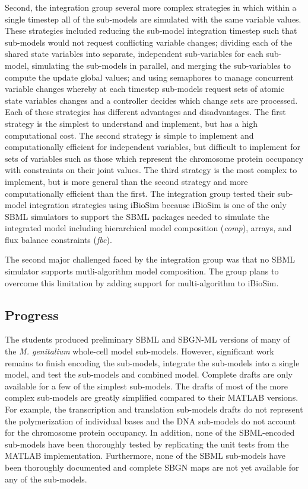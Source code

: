 \documentclass[journal,transmag]{IEEEtran}
\begin{document}
Second, the integration group several more complex strategies in which within a single timestep all of the sub-models are simulated with the same variable values. These strategies included reducing the sub-model integration timestep such that sub-models would not request conflicting variable changes; dividing each of the shared state variables into separate, independent sub-variables for each sub-model, simulating the sub-models in parallel, and merging the sub-variables to compute the update global values; and using semaphores to manage concurrent variable changes whereby at each timestep sub-models request sets of atomic state variables changes and a controller decides which change sets are processed. Each of these strategies has different advantages and disadvantages. The first strategy is the simplest to understand and implement, but has a high computational cost. The second strategy is simple to implement and computationally efficient for independent variables, but difficult to implement for sets of variables such as those which represent the chromosome protein occupancy with constraints on their joint values. The third strategy is the most complex to implement, but is more general than the second strategy and more computationally efficient than the first. The integration group tested their sub-model integration strategies using iBioSim because iBioSim is one of the only SBML simulators to support the SBML packages needed to simulate the integrated model including hierarchical model composition (\emph{comp}), arrays, and flux balance constraints (\emph{fbc}).

The second major challenged faced by the integration group was that no SBML simulator supports mutli-algorithm model composition. The group plans to overcome this limitation by adding support for multi-algorithm to iBioSim.

\subsection{Progress}
The students produced preliminary SBML and SBGN-ML versions of many of the \textit{M. genitalium} whole-cell model sub-models. However, significant work remains to finish encoding the sub-models, integrate the sub-models into a single model, and test the sub-models and combined model. Complete drafts are only available for a few of the simplest sub-models. The drafts of most of the more complex sub-models are greatly simplified compared to their MATLAB versions. For example, the transcription and translation sub-models drafts do not represent the polymerization of individual bases and the DNA sub-models do not account for the chromosome protein occupancy. In addition, none of the SBML-encoded sub-models have been thoroughly tested by replicating the unit tests from the MATLAB implementation. Furthermore, none of the SBML sub-models have been thoroughly documented and complete SBGN maps are not yet available for any of the sub-models.
\end{document}
